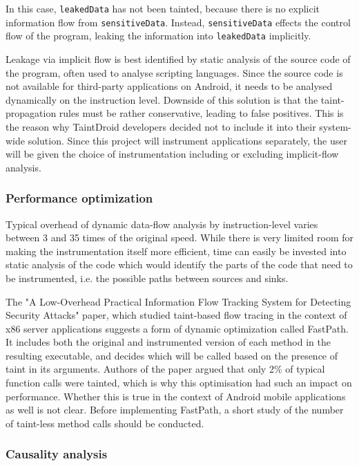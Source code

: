 \documentclass[12pt]{article}
\begin{document}
In this case, \verb|leakedData| has not been tainted, because there is 
no explicit information flow from \verb|sensitiveData|. Instead, 
\verb|sensitiveData| effects the control flow of the program, leaking
the information into \verb|leakedData| implicitly. 

Leakage via implicit flow is best identified by static analysis of the 
source code of the program, often used to analyse scripting languages. 
Since the source code is not available for third-party applications on 
Android, it needs to be analysed dynamically on the instruction level.
Downside of this solution is that the taint-propagation rules must be
rather conservative, leading to false positives. This is the reason why
TaintDroid developers decided not to include it into their system-wide
solution. Since this project will instrument applications separately, 
the user will be given the choice of instrumentation including or 
excluding implicit-flow analysis.

\subsubsection*{Performance optimization}

Typical overhead of dynamic data-flow analysis by instruction-level 
varies between 3 and 35 times of the original speed. While there is
very limited room for making the instrumentation itself more efficient,
time can easily be invested into static analysis of the code which would
identify the parts of the code that need to be instrumented, i.e. the 
possible paths between sources and sinks. 

The "A Low-Overhead Practical Information Flow Tracking System for 
Detecting Security Attacks" paper, which studied taint-based flow tracing 
in the context of x86 server applications suggests a form of dynamic 
optimization called FastPath. It includes both the original and 
instrumented version of each method in the resulting executable, and
decides which will be called based on the presence of taint in its 
arguments. Authors of the paper argued that only 2\% of typical function
calls were tainted, which is why this optimisation had such an impact
on performance. Whether this is true in the context of Android mobile
applications as well is not clear. Before implementing FastPath, a short 
study of the number of taint-less method calls should be conducted.

\subsubsection*{Causality analysis}
\end{document}
